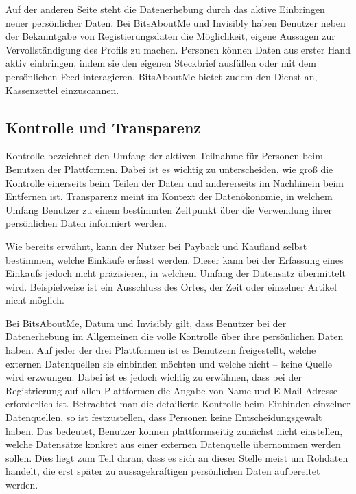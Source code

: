 \noindent Auf der anderen Seite steht die Datenerhebung durch das aktive Einbringen neuer persönlicher Daten. Bei BitsAboutMe und Invisibly haben Benutzer neben der Bekanntgabe von Registierungsdaten die Möglichkeit, eigene Aussagen zur Vervollständigung des Profils zu machen. Personen können Daten aus erster Hand aktiv einbringen, indem sie den eigenen Steckbrief ausfüllen oder mit dem persönlichen Feed interagieren. BitsAboutMe bietet zudem den Dienst an, Kassenzettel einzuscannen. 

\subsection{Kontrolle und Transparenz}
Kontrolle bezeichnet den Umfang der aktiven Teilnahme für Personen beim Benutzen der Plattformen. Dabei ist es wichtig zu unterscheiden, wie groß die Kontrolle einerseits beim Teilen der Daten und andererseits im Nachhinein beim Entfernen ist. Transparenz meint im Kontext der Datenökonomie, in welchem Umfang Benutzer zu einem bestimmten Zeitpunkt über die Verwendung ihrer persönlichen Daten informiert werden. \newline

\noindent Wie bereits erwähnt, kann der Nutzer bei Payback und Kaufland selbst bestimmen, welche Einkäufe erfasst werden. Dieser kann bei der Erfassung eines Einkaufs jedoch nicht präzisieren, in welchem Umfang der Datensatz übermittelt wird. Beispielweise ist ein Ausschluss des Ortes, der Zeit oder einzelner Artikel nicht möglich. \newline

\noindent Bei BitsAboutMe, Datum und Invisibly gilt, dass Benutzer bei der Datenerhebung im Allgemeinen die volle Kontrolle über ihre persönlichen Daten haben. Auf jeder der drei Plattformen ist es Benutzern freigestellt, welche externen Datenquellen sie einbinden möchten und welche nicht -- keine Quelle wird erzwungen. Dabei ist es jedoch wichtig zu erwähnen, dass bei der Registrierung auf allen Plattformen die Angabe von Name und E-Mail-Adresse erforderlich ist. Betrachtet man die detailierte Kontrolle beim Einbinden einzelner Datenquellen, so ist festzustellen, dass Personen keine Entscheidungsgewalt haben. Das bedeutet, Benutzer können plattformseitig zunächst nicht einstellen, welche Datensätze konkret aus einer externen Datenquelle übernommen werden sollen. Dies liegt zum Teil daran, dass es sich an dieser Stelle meist um Rohdaten handelt, die erst später zu aussagekräftigen persönlichen Daten aufbereitet werden. \newline


